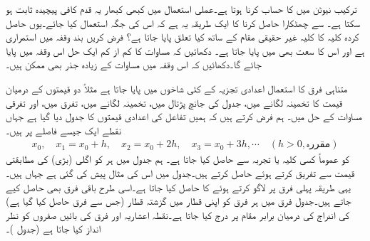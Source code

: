 \quad
ترکیب نیوٹن میں  کا حساب کرنا ہوتا ہے۔عملی استعمال میں کبھی کبھار یہ قدم کافی پیچیدہ ثابت ہو سکتا ہے۔ سے چھٹکارا حاصل کرنا کا ایک طریقہ یہ ہے کہ اس کی جگہ  استعمال کیا جائے۔یوں حاصل کردہ کلیہ کا کلیہ غیر حقیقی مقام کے ساتھ کیا تعلق پایا جاتا ہے؟
\quad
فرض کریں بند وقفہ  میں  استمراری ہے اور اس کا سعت بھی  میں پایا جاتا ہے۔ دکھائیں کہ مساوات  کا کم از کم ایک حل اس وقفہ میں پایا جائے گا۔دکھائیں کہ اس وقفہ میں مساوات کے زیادہ جذر بھی ممکن ہیں۔

متناہی فرق کا استعمال اعدادی تجزیہ کے کئی شاخوں میں پایا جاتا ہے مثلاً دو قیمتوں کے درمیان قیمت کا تخمینہ لگانے میں، جدول کی جانچ پڑتال میں، تخمینہ لگانے میں، تفرق میں، اور تفرقی مساوات کے حل میں۔ ہم فرض کرتے ہیں کہ ہمیں تفاعل  کی اعدادی قیمتوں   کا جدول دیا گیا ہے جہاں نقطے  ایک جیسے  فاصلے پر ہیں۔ 
\begin{align*}
x_0,\quad x_1=x_0+h,\quad x_2=x_0+2h,\quad x_3=x_0+3h,\cdots \quad (h>0, \text{مقررہ})
\end{align*}
 کو عموماً کسی کلیہ یا تجربہ سے حاصل کیا جاتا ہے۔ ہم جدول میں ہر   کو اگلی (بڑی)  کی مطابقتی قیمت سے تفریق کرتے ہوئے  حاصل کرتے ہیں۔جدول  میں اس کی مثال پیش کی گئی ہے جہاں  ہیں۔یہی طریقہ پہلی فرق پر لاگو کرتے ہوئے  کا  حاصل کیا جاتا ہے۔اسی طرح باقی فرق بھی حاصل کیے جاتے ہیں۔جدول فرق میں ہر فرق کو اپنی قطار میں گزشتہ قطار (جس سے فرق حاصل کیا گیا ہے) کی اندراج کی درمیان برابر  مقام پر درج کیا جاتا ہے۔نقطہ اعشاریہ اور فرق کی بائیں صفروں کو نظر انداز کیا جاتا ہے (جدول )۔ 

